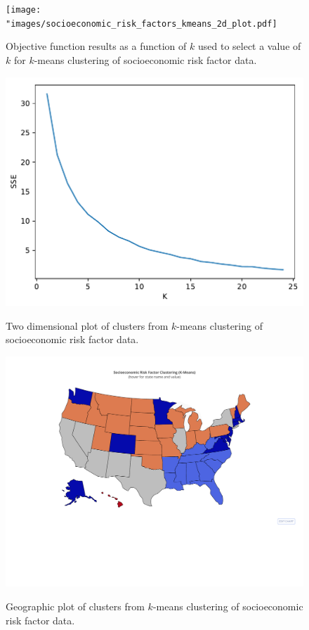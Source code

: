 \documentclass{article}
\begin{document}
\begin{figure}[h]
\centering
\caption{Objective function results as a function of $k$ used to select a value of $k$ for $k$-means clustering of socioeconomic risk factor data.}
\texttt{[image: "images/socioeconomic\_risk\_factors\_kmeans\_2d\_plot.pdf]}
\label{fig:kmeanssocioselect}
\end{figure}

\begin{figure}[h]
\centering
\caption{Two dimensional plot of clusters from $k$-means clustering of socioeconomic risk factor data.}
\includegraphics[width=\linewidth]{images/socioeconomic_risk_factors_kmeans_objc_tuning.pdf}
\label{fig:kmeanssocioscat}
\end{figure}

\begin{figure}[h]
\centering
\caption{Geographic plot of clusters from $k$-means clustering of socioeconomic risk factor data.}
\includegraphics[width=\linewidth]{images/socioeconomic_risk_factor_kmeans_map.pdf}
\label{fig:kmeanssociomap}
\end{figure}
\end{document}
